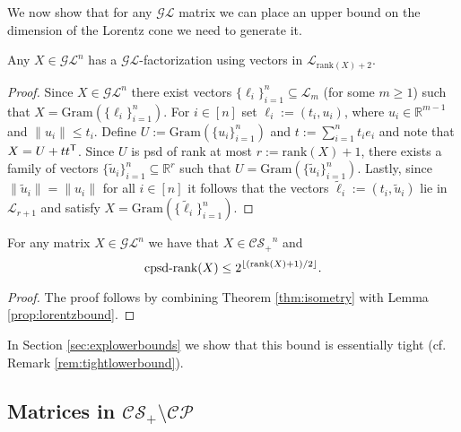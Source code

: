 \documentclass{siamart}
\begin{document}
{{We now show that for any  ${\mathcal{GL}}$ matrix we can place an upper  bound on the  dimension of the Lorentz cone we need to generate it.

\medskip 
\begin{lemma}\label{prop:lorentzbound}
Any   $X\in {\mathcal{GL}}^n$ has  a ${\mathcal{GL}}$-factorization using vectors in ${\mathcal{L}}_{{\mathrm{rank}}(X)+2}.$
\end{lemma}
\medskip

\begin{proof}
Since $X\in {\mathcal{GL}}^n$ there exist vectors  $\{\ell_i\}_{i=1}^n\subseteq {\mathcal{L}}_m$ (for some $m\ge 1$) such that $X= {\mathrm{Gram}}( \{ \ell_i \}_{i=1}^n )$. For $i\in [n]$ set  $\ell_i:=(t_i,u_i)$, where $u_i\in {\mathbb{R}}^{m-1}$ and $\|u_i\| \le t_i$.  Define $U:= {\mathrm{Gram}}( \{ u_i \}_{i=1}^n )$ and $t:=\sum_{i=1}^n t_ie_i$ and note that  $X=U+tt^{{\sf T}}$. Since $U$ is psd of rank at most $r:={\mathrm{rank}}(X)+1$, there exists a family of vectors $\{\tilde{u}_i\}_{i=1}^n\subseteq {\mathbb{R}}^r$ such that   $U= {\mathrm{Gram}}( \{ \tilde{u}_i \}_{i=1}^n )$. Lastly, since $\| \tilde{u}_i \| = \| u_i \|$ for all $i\in [n]$ it follows that  the vectors $\tilde{\ell}_i:=(t_i,\tilde{u}_i)$ lie in {${\mathcal{L}}_{r+1}$} and satisfy $ X= {\mathrm{Gram}}( \{ \tilde{\ell}_i \}_{i=1}^n )$.
\end{proof}
\medskip 

\begin{theorem}\label{upperboundcpsd}
For any matrix $X\in {\mathcal{GL}}^n$ we have that  $X\in {\mathcal{CS}_+}^n$ and
\begin{equation}\label{cor:glupperbound}
 {\mathrm{cpsd}\textnormal{-rank}}(X)\le 2^{\lfloor ({\mathrm{rank}}(X)+1)/2\rfloor}.
\end{equation}
\end{theorem}

\begin{proof}
The proof follows by combining Theorem \ref{thm:isometry} with Lemma \ref{prop:lorentzbound}.
\end{proof}
\vspace{0.1cm} 

In Section \ref{sec:explowerbounds} we show that this bound is essentially tight (cf. Remark \ref{rem:tightlowerbound}).

\subsection{Matrices in ${\mathcal{CS}_+}\setminus {\mathcal{CP}}$}\label{sec:cpsdcpseparation}

}}
\end{document}
